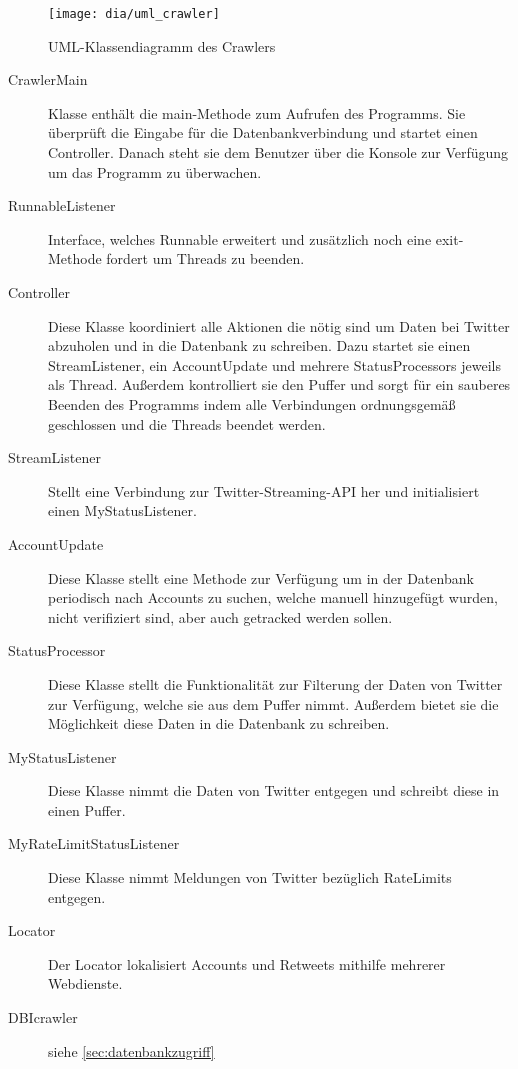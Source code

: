\begin{figure}[h!]
	\centering
	\texttt{[image: dia/uml\_crawler]}
	\caption{UML-Klassendiagramm des Crawlers}
	\label{fig:uml_crawler}
\end{figure}

\begin{description}
\item[CrawlerMain] Klasse enthält die main-Methode zum Aufrufen des Programms. Sie überprüft die Eingabe für die Datenbankverbindung und startet einen Controller. Danach steht sie dem Benutzer über die Konsole zur Verfügung um das Programm zu überwachen.
\item[RunnableListener] Interface, welches Runnable erweitert und zusätzlich noch eine exit-Methode fordert um Threads zu beenden.
\item[Controller] Diese Klasse koordiniert alle Aktionen die nötig sind um Daten bei Twitter abzuholen und in die Datenbank zu schreiben. Dazu startet sie einen StreamListener, ein AccountUpdate und mehrere StatusProcessors jeweils als Thread. Außerdem kontrolliert sie den Puffer und sorgt für ein sauberes Beenden des Programms indem alle Verbindungen ordnungsgemäß geschlossen und die Threads beendet werden.
\item[StreamListener] Stellt eine Verbindung zur Twitter-Streaming-API her und initialisiert einen MyStatusListener.
\item[AccountUpdate] Diese Klasse stellt eine Methode zur Verfügung um in der Datenbank periodisch nach Accounts zu suchen, welche manuell hinzugefügt wurden, nicht verifiziert sind, aber auch getracked werden sollen.
\item[StatusProcessor] Diese Klasse stellt die Funktionalität zur Filterung der Daten von Twitter zur Verfügung, welche sie aus dem Puffer nimmt. Außerdem bietet sie die Möglichkeit diese Daten in die Datenbank zu schreiben.
\item[MyStatusListener] Diese Klasse nimmt die Daten von Twitter entgegen und schreibt diese in einen Puffer.
\item[MyRateLimitStatusListener] Diese Klasse nimmt Meldungen von Twitter bezüglich RateLimits entgegen.
\item[Locator] Der Locator lokalisiert Accounts und Retweets mithilfe mehrerer Webdienste.
\item[DBIcrawler] siehe \cref{sec:datenbankzugriff}
\end{description}

